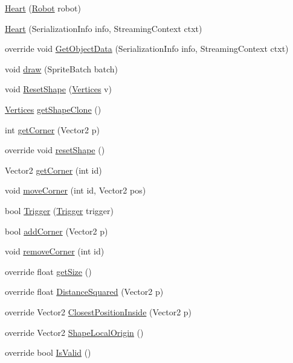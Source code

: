 \begin{DoxyCompactItemize}
\item 
\hyperlink{classgearit_1_1src_1_1robot_1_1_heart_aae8fe1f5a851e312671c388d85e2cdef}{Heart} (\hyperlink{classgearit_1_1src_1_1robot_1_1_robot}{Robot} robot)
\item 
\hyperlink{classgearit_1_1src_1_1robot_1_1_heart_abbf2e83bed0507a0f46df9c858ac920f}{Heart} (Serialization\+Info info, Streaming\+Context ctxt)
\item 
override void \hyperlink{classgearit_1_1src_1_1robot_1_1_heart_a7c08e07bed9647315d5a409823344044}{Get\+Object\+Data} (Serialization\+Info info, Streaming\+Context ctxt)
\item 
void \hyperlink{classgearit_1_1src_1_1robot_1_1_heart_af830f0dedfd8ce3db43a9ef74bda6143}{draw} (Sprite\+Batch batch)
\item 
void \hyperlink{classgearit_1_1src_1_1robot_1_1_heart_afc6baa8cc3cf66e8a1768f10ab0761e0}{Reset\+Shape} (\hyperlink{class_farseer_physics_1_1_common_1_1_vertices}{Vertices} v)
\item 
\hyperlink{class_farseer_physics_1_1_common_1_1_vertices}{Vertices} \hyperlink{classgearit_1_1src_1_1robot_1_1_heart_aefa7cf672e4df884308cfdf217f0ddd6}{get\+Shape\+Clone} ()
\item 
int \hyperlink{classgearit_1_1src_1_1robot_1_1_heart_a649572e721893c41c5a2fc897bf1cfeb}{get\+Corner} (Vector2 p)
\item 
override void \hyperlink{classgearit_1_1src_1_1robot_1_1_heart_a5555d8f8aadbbf5e193d06ab3a51b26d}{reset\+Shape} ()
\item 
Vector2 \hyperlink{classgearit_1_1src_1_1robot_1_1_heart_a49374d9684d5b1a379145f64e010eea6}{get\+Corner} (int id)
\item 
void \hyperlink{classgearit_1_1src_1_1robot_1_1_heart_aeca15387a267b45af8665256602ed3f3}{move\+Corner} (int id, Vector2 pos)
\item 
bool \hyperlink{classgearit_1_1src_1_1robot_1_1_heart_a36566816f461fac49912ebc61d0f9ad4}{Trigger} (\hyperlink{classgearit_1_1src_1_1map_1_1_trigger}{Trigger} trigger)
\item 
bool \hyperlink{classgearit_1_1src_1_1robot_1_1_heart_a5b57c83c92c934c6973c27d4593bd6d0}{add\+Corner} (Vector2 p)
\item 
void \hyperlink{classgearit_1_1src_1_1robot_1_1_heart_ab80c951fd2929d4e0da256816d9fe8b9}{remove\+Corner} (int id)
\item 
override float \hyperlink{classgearit_1_1src_1_1robot_1_1_heart_a04aa4abe0ad58c7fe7049d12bec75782}{get\+Size} ()
\item 
override float \hyperlink{classgearit_1_1src_1_1robot_1_1_heart_aa168294845abc76d160077e60a5d8ed8}{Distance\+Squared} (Vector2 p)
\item 
override Vector2 \hyperlink{classgearit_1_1src_1_1robot_1_1_heart_ab4622425c42f5010e5def4d6d93fbc06}{Closest\+Position\+Inside} (Vector2 p)
\item 
override Vector2 \hyperlink{classgearit_1_1src_1_1robot_1_1_heart_a8a6e44525d8d48b4e82c91bc74ec63bf}{Shape\+Local\+Origin} ()
\item 
override bool \hyperlink{classgearit_1_1src_1_1robot_1_1_heart_adec972aa89332e630fcf7d09bd86c90c}{Is\+Valid} ()
\end{DoxyCompactItemize}
